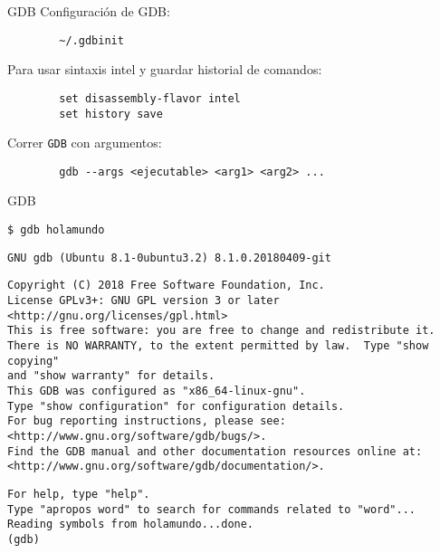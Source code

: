 \documentclass[aspectratio=169]{beamer}
\begin{document}
\begin{frame}[fragile]{GDB}
    Configuración de GDB:\\
    \vspace{0.1cm}
    \begin{verbatim}
        ~/.gdbinit 
    \end{verbatim}
    \vspace{0.4cm}
    Para usar sintaxis intel y guardar historial de comandos:\\
    \vspace{0.1cm}
    \begin{verbatim}
        set disassembly-flavor intel
        set history save
    \end{verbatim}
    \vspace{0.4cm}
    Correr \texttt{GDB} con argumentos:
    \vspace{0.1cm}
    \begin{verbatim}
        gdb --args <ejecutable> <arg1> <arg2> ...
    \end{verbatim}
\end{frame}

\begin{frame}[fragile,t]{GDB}
\small
\begin{verbatim}
$ gdb holamundo 
\end{verbatim}
\pause
\begin{verbatim}
GNU gdb (Ubuntu 8.1-0ubuntu3.2) 8.1.0.20180409-git
\end{verbatim}
\scriptsize
\vspace{-0.8cm}
\begin{verbatim}
Copyright (C) 2018 Free Software Foundation, Inc.
License GPLv3+: GNU GPL version 3 or later <http://gnu.org/licenses/gpl.html>
This is free software: you are free to change and redistribute it.
There is NO WARRANTY, to the extent permitted by law.  Type "show copying"
and "show warranty" for details.
This GDB was configured as "x86_64-linux-gnu".
Type "show configuration" for configuration details.
For bug reporting instructions, please see:
<http://www.gnu.org/software/gdb/bugs/>.
Find the GDB manual and other documentation resources online at:
<http://www.gnu.org/software/gdb/documentation/>.
\end{verbatim}
\small
\vspace{-0.8cm}
\begin{verbatim}
For help, type "help".
Type "apropos word" to search for commands related to "word"...
Reading symbols from holamundo...done.
(gdb) 
\end{verbatim}
\end{frame}
\end{document}
